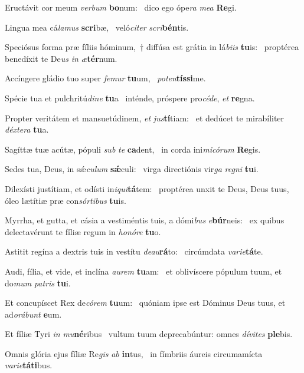 \item Eructávit cor meum \textit{verbum} \textbf{bo}num:~\psstar{} dico ego ópe\textit{ra} \textit{mea} \textbf{Re}gi.
\item Lingua mea cá\textit{lamus} \textbf{scri}bæ,~\psstar{} veló\textit{citer} \textit{scri}\textbf{bén}tis.
\item Speciósus forma præ fíliis hóminum,~† diffúsa est grátia in lá\textit{biis} \textbf{tu}is:~\psstar{} proptérea benedíxit te De\textit{us} \textit{in} \textit{æ}\textbf{tér}num.
\item Accíngere gládio tuo super \textit{femur} \textbf{tu}um,~\psstar{} \textit{poten}\textbf{tís}\textbf{si}me.
\item Spécie tua et pulchritú\textit{dine} \textbf{tu}a~\psstar{} inténde, próspere pro\textit{céde}, \textit{et} \textbf{re}gna.
\item Propter veritátem et mansuetúdinem, \textit{et} \textit{jus}\textbf{tí}tiam:~\psstar{} et dedúcet te mirabíliter \textit{déxtera} \textbf{tu}a.
\item Sagíttæ tuæ acútæ, pópuli \textit{sub} \textit{te} \textbf{ca}dent,~\psstar{} in corda ini\textit{micórum} \textbf{Re}gis.
\item Sedes tua, Deus, in sǽ\textit{culum} \textbf{sǽ}culi:~\psstar{} virga directiónis vir\textit{ga} \textit{regni} \textbf{tu}i.
\item Dilexísti justítiam, et odísti in\textit{iqui}\textbf{tá}tem:~\psstar{} proptérea unxit te Deus, Deus tuus, óleo lætítiæ præ con\textit{sórtibus} \textbf{tu}is.
\item Myrrha, et gutta, et cásia a vestiméntis tuis, a dómi\textit{bus} \textit{e}\textbf{búr}neis:~\psstar{} ex quibus delectavérunt te fíliæ regum in \textit{honóre} \textbf{tu}o.
\item Astitit regína a dextris tuis in vestítu \textit{deau}\textbf{rá}to:~\psstar{} circúmdata \textit{varie}\textbf{tá}te.
\item Audi, fília, et vide, et inclína \textit{aurem} \textbf{tu}am:~\psstar{} et oblivíscere pópulum tuum, et do\textit{mum} \textit{patris} \textbf{tu}i.
\item Et concupíscet Rex de\textit{córem} \textbf{tu}um:~\psstar{} quóniam ipse est Dóminus Deus tuus, et ad\textit{orábunt} \textbf{e}um.
\item Et fíliæ Tyri \textit{in} \textit{mu}\textbf{né}ribus~\psstar{} vultum tuum deprecabúntur: omnes \textit{dívites} \textbf{ple}bis.
\item Omnis glória ejus fíliæ Re\textit{gis} \textit{ab} \textbf{in}tus,~\psstar{} in fímbriis áureis circumamícta \textit{varie}\textbf{tá}\textbf{ti}bus.
